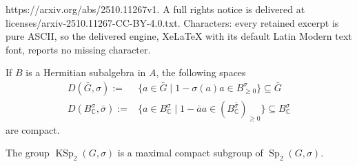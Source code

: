 \documentclass[10pt,a4paper]{amsart}
\DeclareMathOperator{\KSp}{KSp}
\DeclareMathOperator{\Sp}{Sp}
\begin{document}
https://arxiv.org/abs/2510.11267v1. A full rights notice is delivered at licenses/arxiv-2510.11267-CC-BY-4.0.txt. Characters: every retained excerpt is pure ASCII, so the delivered engine, XeLaTeX with its default Latin Modern text font, reports no missing character.
\begin{prop}\label{comp_disc}
If $B$ is a Hermitian subalgebra in $A$, the following spaces
    \begin{align*}
        D(\bar G,\sigma):=& \{a\in \bar G\mid 1-\sigma(a)a\in B^{\sigma}_{\geq 0}\}\subseteq \bar G\\
        D(B_\mathbb C^\sigma,\bar\sigma):=& \{a\in  B^{\sigma}_\mathbb C\mid 1-\bar aa\in (B_\mathbb C^{\bar\sigma})_{\geq 0}\}\subseteq B_\mathbb C^\sigma
    \end{align*}
    are compact.
\end{prop}

\begin{teo}\label{maxcomp-Sp_R}
The group $\KSp_2(G,\sigma)$ is a maximal compact subgroup of $\Sp_2(G,\sigma)$.
\end{teo}
\end{document}

